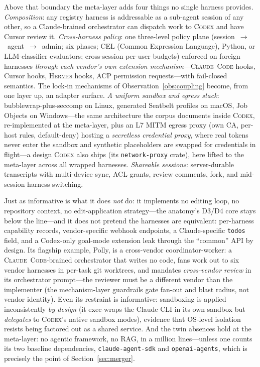 \documentclass[11pt,a4paper]{article}
\newcommand{\clcode}{\textsc{Claude~Code}\xspace}
\newcommand{\cdx}{\textsc{Codex}\xspace}
\newcommand{\hrm}{\textsc{Hermes}\xspace}
\begin{document}
Above that boundary the meta-layer adds four things no single harness provides.
\emph{Composition}: any registry harness is addressable as a sub-agent session of any other, so a Claude-brained orchestrator can dispatch work to \cdx{} and have Cursor review it.
\emph{Cross-harness policy}: one three-level policy plane (session~$\to$~agent~$\to$~admin; six phases; CEL (Common Expression Language), Python, or LLM-classifier evaluators; cross-session per-user budgets) enforced on foreign harnesses \emph{through each vendor's own extension mechanism}---\clcode{} hooks, Cursor hooks, \hrm{} hooks, ACP permission requests---with fail-closed semantics.
The lock-in mechanisms of Observation~\ref{obs:coupling} become, from one layer up, an adapter surface.
\emph{A uniform sandbox and egress stack}: bubblewrap-plus-seccomp on Linux, generated Seatbelt profiles on macOS, Job Objects on Windows---the same architecture the corpus documents inside \cdx{}, re-implemented at the meta-layer, plus an L7 MITM egress proxy (own CA, per-host rules, default-deny) hosting a \emph{secretless credential proxy}, where real tokens never enter the sandbox and synthetic placeholders are swapped for credentials in flight---a design \cdx{} also ships (its \texttt{network-proxy} crate), here lifted to the meta-layer across all wrapped harnesses.
\emph{Shareable sessions}: server-durable transcripts with multi-device sync, ACL grants, review comments, fork, and mid-session harness switching.

Just as informative is what it does \emph{not} do: it implements no editing loop, no repository context, no edit-application strategy---the anatomy's D3/D4 core stays below the line---and it does not pretend the harnesses are equivalent: per-harness capability records, vendor-specific webhook endpoints, a Claude-specific \texttt{todos} field, and a Codex-only goal-mode extension leak through the ``common'' API by design.
Its flagship example, Polly, is a cross-vendor coordinator-worker: a \clcode{}-brained orchestrator that writes no code, fans work out to six vendor harnesses in per-task git worktrees, and mandates \emph{cross-vendor review} in its orchestrator prompt---the reviewer must be a different vendor than the implementer (the mechanism-layer guardrails gate fan-out and blast radius, not vendor identity).
Even its restraint is informative: sandboxing is applied inconsistently \emph{by design} (it exec-wraps the Claude CLI in its own sandbox but \emph{delegates} to \cdx{}'s native sandbox modes), evidence that OS-level isolation resists being factored out as a shared service.
And the twin absences hold at the meta-layer: no agentic framework, no RAG, in a million lines---unless one counts its two baseline dependencies, \texttt{claude-agent-sdk} and \texttt{openai-agents}, which is precisely the point of Section~\ref{sec:merger}.
\end{document}
